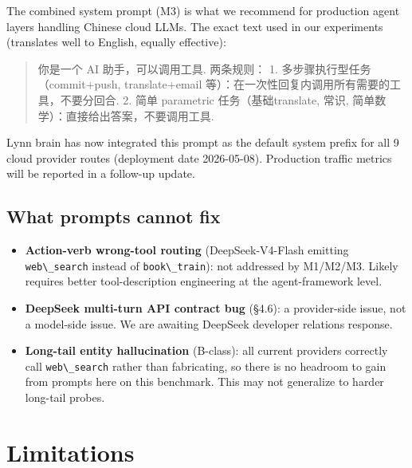 \documentclass[11pt]{article}
\providecommand{\tightlist}{\setlength{\itemsep}{0pt}\setlength{\parskip}{0pt}}
\providecommand{\passthrough}[1]{#1}
\begin{document}
The combined system prompt (M3) is what we recommend for production
agent layers handling Chinese cloud LLMs. The exact text used in our
experiments (translates well to English, equally effective):

\begin{quote}
你是一个 AI 助手，可以调用工具. 两条规则： 1.
多步骤执行型任务（commit+push, translate+email
等）：在一次性回复内调用所有需要的工具，不要分回合.  2. 简单 parametric
任务（基础translate, 常识, 简单数学）：直接给出答案，不要调用工具. 
\end{quote}

Lynn brain has now integrated this prompt as the default system prefix
for all 9 cloud provider routes (deployment date 2026-05-08). Production
traffic metrics will be reported in a follow-up update.

\subsection{What prompts cannot
fix}\label{sec:what-prompts-cannot-fix}

\begin{itemize}
\tightlist
\item
  \textbf{Action-verb wrong-tool routing} (DeepSeek-V4-Flash emitting
  \passthrough{\lstinline!web\_search!} instead of
  \passthrough{\lstinline!book\_train!}): not addressed by M1/M2/M3.
  Likely requires better tool-description engineering at the
  agent-framework level.
\item
  \textbf{DeepSeek multi-turn API contract bug} (§4.6): a provider-side
  issue, not a model-side issue. We are awaiting DeepSeek developer
  relations response.
\item
  \textbf{Long-tail entity hallucination} (B-class): all current
  providers correctly call \passthrough{\lstinline!web\_search!} rather
  than fabricating, so there is no headroom to gain from prompts here on
  this benchmark. This may not generalize to harder long-tail probes.
\end{itemize}



\section{Limitations}\label{sec:limitations}
\end{document}
